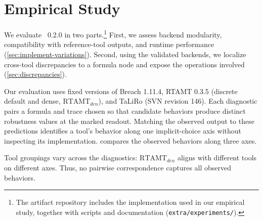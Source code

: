 \section{Empirical Study}
\label{sec:evaluation}

We evaluate \tool~0.2.0 in two parts.\footnote{
The artifact repository includes the implementation used in our
empirical study, together with scripts and documentation (\texttt{extra/experiments/}).}
First, we assess
backend modularity, compatibility with reference-tool outputs, and runtime
performance (\cref{sec:implement-variations}). Second, using the validated
backends, we localize cross-tool discrepancies to a formula node and expose the
operations involved (\cref{sec:discrepancies}).

Our evaluation uses fixed versions of Breach 1.11.4, RTAMT 0.3.5 (discrete
default and dense, $\mathrm{RTAMT}_{den}$), and TaLiRo (SVN revision 146).
Each diagnostic pairs a formula and trace chosen so that candidate behaviors
produce distinct robustness values at the marked readout. Matching the observed
output to these predictions identifies a tool's behavior along one
implicit-choice axis without inspecting its implementation.
 compares the observed behaviors along three axes.

\begin{table}[t]
\centering
\caption{Diagnostic comparison of Breach, TaLiRo, and RTAMT in discrete and
dense modes. Each row isolates one finite-trace choice. \emph{Top}: sampled
traces used by diagnostics (i)--(iii); horizontal positions follow sample
index, tick labels show actual timestamps, and the orange ring marks the
reported sample. \emph{Bottom}: the behavior inferred from each tool's output,
with the observed robustness in parentheses. \emph{n/o}: the choice is not
observable from TaLiRo's whole-trace scalar output.}
\label{tab:divergence-profile}

\scalebox{0.95}{}

\medskip

\end{table}

Tool groupings vary across the diagnostics: $\mathrm{RTAMT}_{den}$ aligns with
different tools on different axes. Thus, no pairwise correspondence captures
all observed behaviors.

